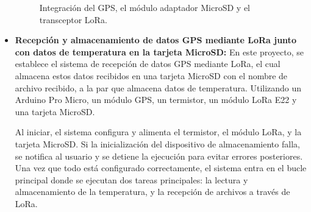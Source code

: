 \begin{itemize}
\begin{figure}[H]
    \centering
    \quad
    \caption{Integración del GPS, el módulo adaptador MicroSD y el transceptor LoRa.}
    \label{fig:lora-memoria-img}
\end{figure}

\item \textbf{Recepción y almacenamiento de datos GPS mediante LoRa junto con datos de temperatura en la tarjeta MicroSD:} 
En este proyecto, se establece el sistema de recepción de datos GPS mediante LoRa, el cual almacena estos datos recibidos en una tarjeta MicroSD con el nombre de archivo recibido, a la par que almacena datos de temperatura. Utilizando un Arduino Pro Micro, un módulo GPS, un termistor, un módulo LoRa E22 y una tarjeta MicroSD.

Al iniciar, el sistema configura y alimenta el termistor, el módulo LoRa, y la tarjeta MicroSD. Si la inicialización del dispositivo de almacenamiento falla, se notifica al usuario y se detiene la ejecución para evitar errores posteriores. Una vez que todo está configurado correctamente, el sistema entra en el bucle principal donde se ejecutan dos tareas principales: la lectura y almacenamiento de la temperatura, y la recepción de archivos a través de LoRa.


\end{itemize}
